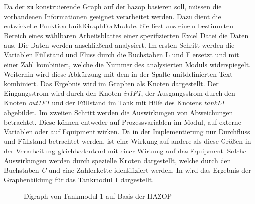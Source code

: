 Da der zu konstruierende Graph auf der \ac{hazop} basieren soll, m\"ussen die vorhandenen Informationen geeignet verarbeitet werden. Dazu dient die entwickelte Funktion \glqq buildGraphForModule\grqq . Sie liest aus einem bestimmten Bereich eines w\"ahlbaren Arbeitsblattes einer spezifizierten Excel Datei die Daten aus. Die Daten werden anschlie\ss{}end analysiert. \newline
Im ersten Schritt werden die Variablen F\"ullstand und Fluss durch die Buchstaben L und F ersetzt und mit einer Zahl kombiniert, welche die Nummer des analysierten Moduls widerspiegelt. Weiterhin wird diese Abk\"urzung mit dem in der Spalte \glqq unit\grqq { }definierten Text kombiniert. Das Ergebnis wird im Graphen als Knoten dargestellt. Der Eingangsstrom wird durch den Knoten \textit{in1F1}, der Ausgangsstrom durch den Knoten \textit{out1F1} und der F\"ullstand im Tank mit Hilfe des Knotens \textit{tankL1} abgebildet. \newline
Im zweiten Schritt werden die Auswirkungen von Abweichungen betrachtet. Diese k\"onnen entweder auf Prozessvariablen im Modul, auf externe Variablen oder auf Equipment wirken. Da in der Implementierung nur Durchfluss und F\"ullstand betrachtet werden, ist eine Wirkung auf andere als diese Gr\"o\ss{}en in der Verarbeitung gleichbedeutend mit einer Wirkung auf das Equipment. Solche Auswirkungen werden durch spezielle Knoten dargestellt, welche durch den Buchstaben \textit{C} und eine Zahlenkette identifiziert werden. In  wird das Ergebnis der Graphenbildung f\"ur das Tankmodul 1 dargestellt.

\begin{figure}[h!tb]
\centering

\caption[Digraph von Modul 1]{Digraph von Tankmodul 1 auf Basis der HAZOP}
\label{fig:graph_mod1}
\end{figure}

